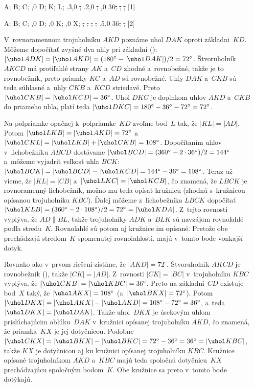 {%
\fontplace
\rpoint A; \lpoint B; \bpoint C; \bpoint{},0 D;
\ltpoint K; \tpoint L;
\everymath{\ssize}%
\cpoint\xy.3,0 \st; \cpoint\xy.2,0 \st; \cpoint{},0 36\st;
\st; \st;
[1] \hfil\Obr

\fontplace
\rpoint A; \lpoint B; \bpoint C; \bpoint{},0 D;
\ltpoint{},0 K;
\brpoint{},0 X;
\everymath{\ssize}%
\st; \st; \st;
\st; \cpoint\xy.5,0 36\st;
\st;
[2] \hfil\Obr

V~rovnoramennom trojuholníku $AKD$ poznáme uhol $DAK$ oproti
základni~$KD$. Môžeme dopočítať zvyšné dva uhly pri základni
(\obr): $|\uhol ADK|=|\uhol AKD|=(180^\circ-|\uhol
DAK|)/2=72^\circ$. Štvoruholník $AKCD$ má protiľahlé strany $AK$
a~$CD$ zhodné a~rovnobežné, takže je to rovnobežník, preto
priamky $KC$ a~$AD$ sú rovnobežné. Uhly $DAK$ a~$CKB$ sú teda
súhlasné a~uhly $CKB$ a~$KCD$ striedavé. Preto $|\uhol CKB|=|\uhol
KCD|=36^\circ$. Uhol $DKC$ je doplnkom
uhlov $AKD$ a~$CKB$ do priameho uhla, platí teda $|\uhol
DKC|=180^\circ-36^\circ-72^\circ=72^\circ$.
\inspicture{}

Na polpriamke opačnej k~polpriamke~$KD$ zvoľme bod~$L$ tak, že
$|KL|=|AD|$. Potom $|\uhol LKB|=|\uhol AKD|=72^\circ$
a~$|\uhol CKL|=|\uhol LKB|+|\uhol CKB|=108^\circ$.
Dopočítaním uhlov v~lichobežníku $ABCD$ dostávame $|\uhol
BCD|=(360^\circ-2\cdot 36^\circ)/2=144^\circ$ a~môžeme
vyjadriť veľkosť uhla $BCK$: $|\uhol BCK|=|\uhol BCD|-|\uhol
KCD|=144^\circ-36^\circ=108^\circ$. Teraz už vieme, že $|KL|=|CB|$
a~$|\uhol LKC|=|\uhol KCB|$, čo znamená, že $LBCK$ je rovnoramenný
lichobežník, možno mu teda opísať kružnicu (zhodnú s~kružnicou
opísanou trojuholníku $KBC$). Ďalej môžeme z~lichobežníka $LBCK$
dopočítať $|\uhol KLB|=(360^\circ - {2\cdot
108^\circ})/2=72^\circ=|\uhol KDA|$. Z~tejto rovnosti vyplýva, že
$AD\parallel BL$, takže trojuholníky $ADK$ a~$BLK$ sú
navzájom rovnoľahlé podľa stredu~$K$. Rovnoľahlé sú potom
aj kružnice im opísané. Pretože obe prechádzajú stredom~$K$
spomenutej rovnoľahlosti, majú v~tomto bode vonkajší dotyk.

\ineriesenie
Rovnako ako v~prvom riešení zistíme, že $|AKD|=72^\circ$.
Štvoruholník $AKCD$ je rovnobežník (\obr),
\inspicture{}
takže $|CK|=|AD|$. Z~rovnosti $|CK|=|BC|$ v~trojuholníku $KBC$ vyplýva,
že $|\uhol CKB|=|\uhol KBC|=36^\circ$. Preto na základni~$CD$
existuje bod~$X$ taký, že $|\uhol AKX|=108^\circ$ (a~$|\uhol
BKX|=72^\circ$). Potom $|\uhol DKX|=|\uhol AKX|-|\uhol
AKD|=108^\circ-72^\circ=36^\circ$, a~teda $|\uhol DKX|=|\uhol DAK|$.
Takže uhol~$DKX$ je úsekovým uhlom prislúchajúcim oblúku~$DAK$
v~kružnici opísanej trojuholníku $AKD$, čo znamená, že priamka~$KX$
je jej dotyčnicou. Podobne $|\uhol CKX|=|\uhol BKX|- |\uhol
BKC|=72^\circ-36^\circ=36^\circ=|\uhol KBC|$, takže $KX$ je
dotyčnicou aj ku kružnici opísanej trojuholníku $KBC$. Kružnice opísané
trojuholníkom $AKD$ a~$KBC$ majú teda spoločnú dotyčnicu~$KX$
prechádzajúcu spoločným bodom~$K$. Obe kružnice sa preto v~tomto
bode dotýkajú.}

